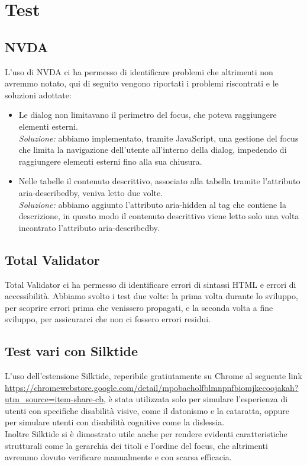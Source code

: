 \section{Test}
\subsection{NVDA}
L'uso di NVDA ci ha permesso di identificare problemi che altrimenti non avremmo notato, qui di seguito vengono riportati i problemi riscontrati e le soluzioni adottate:
\begin{itemize}
    \item Le dialog non limitavano il perimetro del focus, che poteva raggiungere elementi esterni.\\
    \textit{Soluzione:} abbiamo implementato, tramite JavaScript, una gestione del focus che limita la navigazione dell’utente all’interno della dialog, impedendo di raggiungere elementi esterni fino alla sua chiusura.
    \item Nelle tabelle il contenuto descrittivo, associato alla tabella tramite l'attributo aria-describedby, veniva letto due volte.\\
    \textit{Soluzione:} abbiamo aggiunto l'attributo aria-hidden al tag che contiene la descrizione, in questo modo il contenuto descrittivo viene letto solo una volta incontrato l'attributo aria-describedby.
\end{itemize}

\subsection{Total Validator}
Total Validator ci ha permesso di identificare errori di sintassi HTML e errori di accessibilità. Abbiamo svolto i test due volte: la prima volta durante lo sviluppo, per scoprire errori prima che venissero propagati, e la seconda volta a fine sviluppo, per assicurarci che non ci fossero errori residui.
\subsection{Test vari con Silktide}
L'uso dell'estensione Silktide, reperibile gratiutamente su Chrome al seguente link \url{https://chromewebstore.google.com/detail/mpobacholfblmnpnfbiomjkecoojakah?utm_source=item-share-cb}, è stata utilizzata solo per simulare l'esperienza di utenti con specifiche disabilità visive, come il datonismo e la cataratta, oppure per simulare utenti con disabilità cognitive come la dislessia.\\
Inoltre Silktide si è dimostrato utile anche per rendere evidenti caratteristiche strutturali come la gerarchia dei titoli e l'ordine del focus, che altrimenti avremmo dovuto verificare manualmente e con scarsa efficacia.

